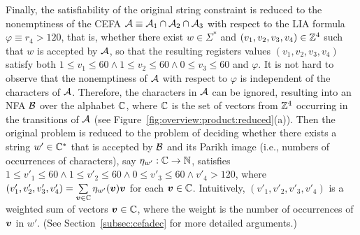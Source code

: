 Finally, the satisfiability of the original string constraint is reduced to the nonemptiness of the CEFA $\mathcal{A}\equiv \mathcal{A}_1 \cap \mathcal{A}_2 \cap \mathcal{A}_3$ with respect to the LIA formula $\varphi \equiv r_4 > 120$, that is, whether there exist $w \in \Sigma^*$ and $(v_1, v_2, v_3, v_4) \in \mathbb{Z}^4$ such that $w$ is accepted by $\mathcal{A}$, so that the resulting registers values $(v_1, v_2, v_3, v_4)$ satisfy both $1 \le v_1 \le 60\wedge 1 \le v_2 \le 60 \wedge 0 \le v_3 \le 60$ and $\varphi$. 
It is not hard to observe that the nonemptiness of $\mathcal{A}$ with respect to $\varphi$ is independent of the characters of $\mathcal{A}$.  Therefore, the characters in $\mathcal{A}$ can be ignored, resulting into an NFA $\mathcal{B}$ over the alphabet $\mathbb{C}$, where $\mathbb{C}$ is the set of vectors from $\mathbb{Z}^4$ occurring in the transitions of $\mathcal{A}$ (see Figure~\ref{fig:overview:product:reduced}(a)). Then the original problem is reduced to the problem of deciding whether there exists a string $w' \in \mathbb{C}^*$ that is accepted by $\mathcal{B}$ and its Parikh image (i.e., numbers of occurrences of characters), say $\eta_{w'}: \mathbb{C} \rightarrow \mathbb{N}$, satisfies $1 \le v'_1 \le 60\wedge 1 \le v'_2 \le 60 \wedge 0 \le v'_3 \le 60 \wedge v'_4 > 120$, where $(v'_1, v'_2, v'_3, v'_4) =  \sum \limits_{\myvec{v} \in \costset} \eta_{w'}(\myvec{v}) \myvec{v}$ for each $\myvec{v}\in \costset$. Intuitively, $(v'_1, v'_2, v'_3, v'_4)$ is a weighted sum of vectors $\myvec{v} \in \costset$, where the weight is the number of occurrences of $\myvec{v}$ in $w'$. (See Section~\ref{subsec:cefadec} for more detailed arguments.)

